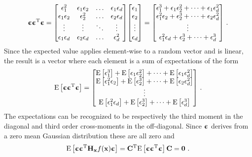 \begin{equation*}
    {\boldsymbol{\upepsilon}}{\boldsymbol{\upepsilon}}{^\mathrm{T}}{\boldsymbol{\upepsilon}} 
    = {\begin{bmatrix}
        \epsilon_1^2 & \epsilon_1\epsilon_2 & \dots & \epsilon_1\epsilon_d\\
        \epsilon_1\epsilon_2 & \epsilon_2^2 & \dots & \epsilon_2\epsilon_d\\
        \vdots &  \vdots & \ddots & \vdots\\
        \epsilon_1\epsilon_d & \epsilon_2\epsilon_d & \dots & \epsilon_d^2
    \end{bmatrix}}
    {\begin{bmatrix}\epsilon_1 \\ \epsilon_2 \\ \vdots \\ \epsilon_d\end{bmatrix}}
    = {\begin{bmatrix}
        \epsilon_1^3 + \epsilon_1\epsilon_2^2 + \cdots + \epsilon_1\epsilon_d^2\\
        \epsilon_1^2\epsilon_2 + \epsilon_2^3 + \cdots + \epsilon_2\epsilon_d^2\\
        \vdots\\
        \epsilon_1^2\epsilon_d + \epsilon_2^3 + \cdots + \epsilon_d^3\\
    \end{bmatrix}} \ .
\end{equation*}
Since the expected value applies element-wise to a random vector and is linear, the result is a vector where each element is a sum of expectations of the form
\begin{equation*}
    \text{E}\left[{\boldsymbol{\upepsilon}}{\boldsymbol{\upepsilon}}{^\mathrm{T}}{\boldsymbol{\upepsilon}}\right] = {\begin{bmatrix}
        \text{E}\left[\epsilon_1^3\right] + \text{E}\left[\epsilon_1\epsilon_2^2\right] + \cdots + \text{E}\left[\epsilon_1\epsilon_d^2\right]\\
        \text{E}\left[\epsilon_1^2\epsilon_2\right] + \text{E}\left[\epsilon_2^3\right] + \cdots + \text{E}\left[\epsilon_2\epsilon_d^2\right]\\
        \vdots\\
        \text{E}\left[\epsilon_1^2\epsilon_d\right] + \text{E}\left[\epsilon_2^3\right] + \cdots + \text{E}\left[\epsilon_d^3\right]\\
    \end{bmatrix}} \ .
\end{equation*}
The expectations can be recognized to be respectively the third moment in the diagonal and third order cross-moments in the off-diagonal. Since ${\boldsymbol{\upepsilon}}$ derives from a zero mean Gaussian distribution these are all zero and
\begin{equation}
	\text{E}\left[{\boldsymbol{\upepsilon}}{\boldsymbol{\upepsilon}}{^\mathrm{T}}{\mathbf{H}}_{\mathbf{x}} f({\mathbf{x}}){\boldsymbol{\upepsilon}}\right] = {\mathbf{C}}{^\mathrm{T}}\text{E}\left[{\boldsymbol{\upepsilon}}{\boldsymbol{\upepsilon}}{^\mathrm{T}}{\boldsymbol{\upepsilon}}\right]{\mathbf{C}} = {\mathbf{0}} \ .
\end{equation}
